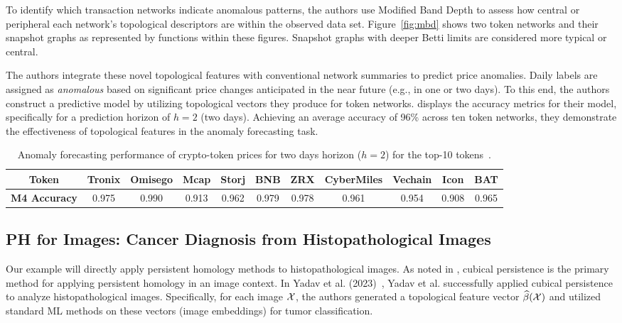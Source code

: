 To identify which transaction networks indicate anomalous patterns, the authors use Modified Band Depth to assess how central or peripheral each network's topological descriptors are within the observed data set. Figure~\ref{fig:mbd} shows two token networks and their snapshot graphs as represented by functions within these figures.  Snapshot graphs with deeper Betti limits are considered more typical or central.

 
The authors integrate these novel topological features with conventional network summaries to predict price anomalies. Daily labels are assigned as \textit{anomalous} based on significant price changes anticipated in the near future (e.g., in one or two days). To this end, the authors construct a predictive model by utilizing topological vectors they produce for token networks.  displays the accuracy metrics for their model, specifically for a prediction horizon of $h=2$ (two days). Achieving an average accuracy of 96\% across ten token networks, they demonstrate the effectiveness of topological features in the anomaly forecasting task.

  

\begin{table}[t]
    \centering
    \caption{Anomaly forecasting performance of crypto-token prices for two days horizon ($h=2$) for the top-10 tokens~\cite{li2020dissecting}.}
    \begin{tabular}{ccccccccccc}
    \toprule
    \textbf{Token} & Tronix & Omisego & Mcap & Storj & BNB & ZRX & CyberMiles & Vechain & Icon & BAT \\
    \midrule
    \textbf{M4 Accuracy} & 0.975 & 0.990 & 0.913 & 0.962 & 0.979 & 0.978 & 0.961 & 0.954 & 0.908 & 0.965 \\
    \bottomrule
    \end{tabular}
    \label{tab:tokenaccuracy}
\end{table}
 

 

\subsection{PH for Images: Cancer Diagnosis from Histopathological Images} \label{sec:histo}

Our example will directly apply persistent homology methods to histopathological images. As noted in , cubical persistence is the primary method for applying persistent homology in an image context. In Yadav et al. (2023)~\cite{yadav2023histopathological}, Yadav et al. successfully applied cubical persistence to analyze histopathological images. Specifically, for each image $\mathcal{X}$, the authors generated a topological feature vector $\widehat{\beta}(\mathcal{X})$ and utilized standard ML methods on these vectors (image embeddings) for tumor classification.

